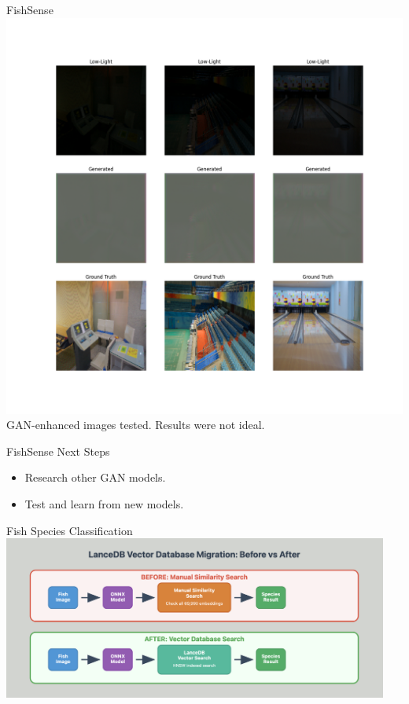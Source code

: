 \begin{frame}{FishSense}
    \centering
    \includegraphics[width=1.0\textwidth, height=0.8\textheight, keepaspectratio]{images/plot_000001.png}
    \vspace{0.5em}
    GAN-enhanced images tested.
    Results were not ideal.
\end{frame}

\begin{frame}{FishSense Next Steps}
    \begin{itemize}
        \item Research other GAN models.
        \item Test and learn from new models.
    \end{itemize}
\end{frame}

\begin{frame}{Fish Species Classification}
    \centering
    \includegraphics[height=0.8\textheight,width=0.95\textwidth,keepaspectratio]{images/vectordb_migration.png}
\end{frame}

